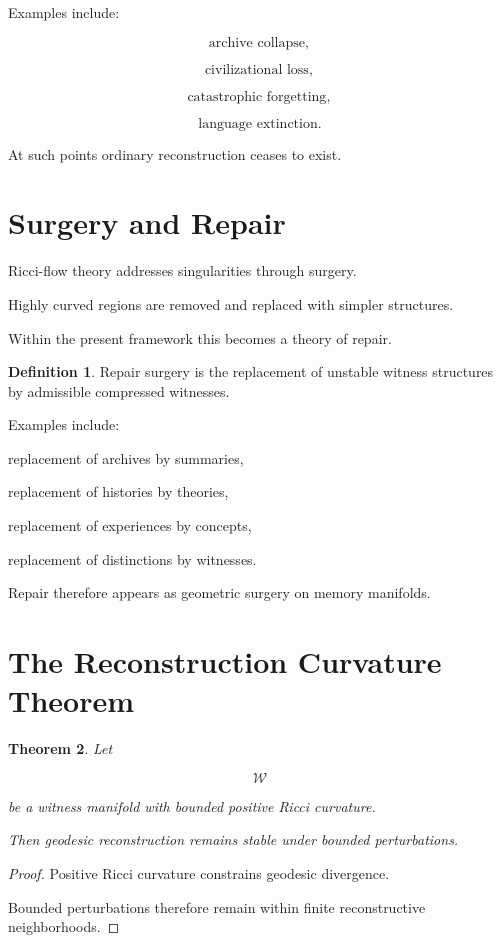 \documentclass[12pt,oneside]{book}
\theoremstyle{plain} \newtheorem{theorem}{Theorem}[chapter] \newtheorem{lemma}[theorem]{Lemma} \newtheorem{proposition}[theorem]{Proposition} \newtheorem{corollary}[theorem]{Corollary}
\theoremstyle{definition} \newtheorem{definition}[theorem]{Definition} \newtheorem{axiom}[theorem]{Axiom} \newtheorem{construction}[theorem]{Construction}
\theoremstyle{remark} \newtheorem{remark}[theorem]{Remark} \newtheorem{example}[theorem]{Example}
\begin{document}
Examples include:

\[
\text{archive collapse},
\]

\[
\text{civilizational loss},
\]

\[
\text{catastrophic forgetting},
\]

\[
\text{language extinction}.
\]

At such points ordinary reconstruction ceases to exist.

\section{Surgery and Repair}

Ricci-flow theory addresses singularities through surgery.

Highly curved regions are removed and replaced with simpler structures.

Within the present framework this becomes a theory of repair.

\begin{definition}

Repair surgery is the replacement of unstable witness structures by admissible compressed witnesses.

\end{definition}

Examples include:

replacement of archives by summaries,

replacement of histories by theories,

replacement of experiences by concepts,

replacement of distinctions by witnesses.

Repair therefore appears as geometric surgery on memory manifolds.

\section{The Reconstruction Curvature Theorem}

\begin{theorem}

Let

\[
\mathcal W
\]

be a witness manifold with bounded positive Ricci curvature.

Then geodesic reconstruction remains stable under bounded perturbations.

\end{theorem}

\begin{proof}

Positive Ricci curvature constrains geodesic divergence.

Bounded perturbations therefore remain within finite reconstructive neighborhoods.

\end{proof}
\end{document}

